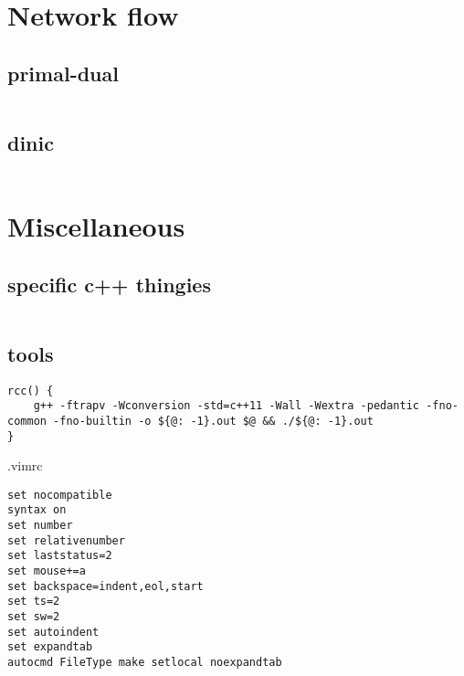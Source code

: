 \documentclass[portrait, 8pt, a4paper, oneside, landscape]{extarticle}
\begin{document}
\section{Network flow}
\subsection{primal-dual}
\inputminted{cpp}{src/primal_dual.cpp}
\subsection{dinic}
\inputminted{cpp}{src/dinic.cpp}

\section{Miscellaneous}
\subsection{specific c++ thingies}
\inputminted{cpp}{src/cpp_utils.cpp}

\subsection{tools}

\begin{verbatim}
rcc() {
    g++ -ftrapv -Wconversion -std=c++11 -Wall -Wextra -pedantic -fno-common -fno-builtin -o ${@: -1}.out $@ && ./${@: -1}.out
}
\end{verbatim}

.vimrc
\begin{verbatim}
set nocompatible
syntax on
set number
set relativenumber
set laststatus=2
set mouse+=a
set backspace=indent,eol,start
set ts=2
set sw=2
set autoindent
set expandtab
autocmd FileType make setlocal noexpandtab
\end{verbatim}

\inputminted{bash}{src/bash_util_cmds.sh}
\end{document}
